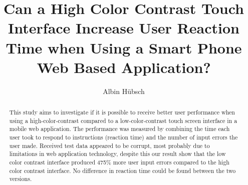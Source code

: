 \documentclass[runningheads,a4paper]{llncs}
\begin{document}
\pagestyle{headings}

\mainmatter


\title{Can a High Color Contrast Touch Interface Increase User Reaction Time when Using a Smart Phone Web Based Application?}





\author{Albin Hübsch}


\maketitle

%
\begin{abstract}
This study aims to investigate if it is possible to receive better user performance when using a high-color-contrast compared to a low-color-contrast touch screen interface in a mobile web application. The performance was measured by combining the time each user took to respond to instructions (reaction time) and the number of input errors the user made. Received test data appeared to be corrupt, most probably due to limitations in web application technology, despite this our result show that the low color contrast interface produced 475\% more user input errors compared to the high color contrast interface. No difference in reaction time could be found between the two versions.
\end{abstract}
%
%
\end{document}
